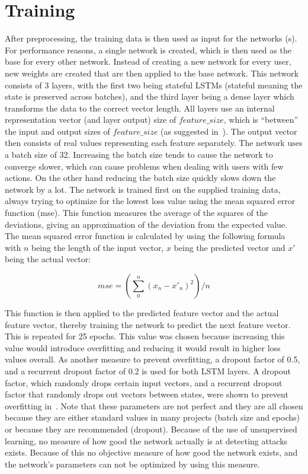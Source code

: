 \section{Training}
After preprocessing, the training data is then used as input for the networks (s). For performance reasons, a single network is created, which is then used as the base for every other network. Instead of creating a new network for every user, new weights are created that are then applied to the base network. This network consists of 3 layers, with the first two being stateful LSTMs (stateful meaning the state is preserved across batches), and the third layer being a dense layer which transforms the data to the correct vector length. All layers use an internal representation vector (and layer output) size of \(feature\_size \), which is \enquote{between} the input and output sizes of \(feature\_size \) (as suggested in~\cite{heaton2008introduction}). The output vector then consists of real values representing each feature separately. The network uses a batch size of 32. Increasing the batch size tends to cause the network to converge slower, which can cause problems when dealing with users with few actions. On the other hand reducing the batch size quickly slows down the network by a lot. The network is trained first on the supplied training data, always trying to optimize for the lowest loss value using the mean squared error function (mse). This function measures the average of the squares of the deviations, giving an approximation of the deviation from the expected value. The mean squared error function is calculated by using the following formula with \(n\) being the length of the input vector, \(x\) being the predicted vector and \(x'\) being the actual vector:

$$ mse = (\sum\limits_{0}^{n} {(x_n - x'_n)}^2) / n $$

This function is then applied to the predicted feature vector and the actual feature vector, thereby training the network to predict the next feature vector. This is repeated for 25 epochs. This value was chosen because increasing this value would introduce overfitting and reducing it would result in higher loss values overall. As another measure to prevent overfitting, a dropout factor of 0.5, and a recurrent dropout factor of 0.2 is used for both LSTM layers. A dropout factor, which randomly drops certain input vectors, and a recurrent dropout factor that randomly drops out vectors between states, were shown to prevent overfitting in~\cite{srivastava2014dropout}. Note that these parameters are not perfect and they are all chosen because they are either standard values in many projects (batch size and epochs) or because they are recommended (dropout). Because of the use of unsupervised learning, no measure of how good the network actually is at detecting attacks exists. Because of this no objective measure of how good the network exists, and the network's parameters can not be optimized by using this measure.


